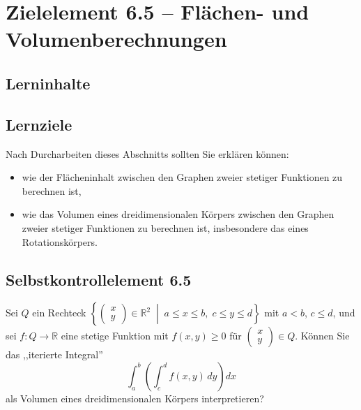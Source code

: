 \documentclass[a4paper,12pt]{article}
\begin{document}
\section*{Zielelement 6.5 -- Flächen- und Volumenberechnungen}

\subsection*{Lerninhalte}

\begin{center}
\end{center}

\subsection*{Lernziele}

Nach Durcharbeiten dieses Abschnitts sollten Sie erklären können:
\begin{itemize}
  \item wie der Flächeninhalt zwischen den Graphen zweier stetiger Funktionen
        zu berechnen ist,
  \item wie das Volumen eines dreidimensionalen Körpers zwischen den Graphen
        zweier stetiger Funktionen zu berechnen ist, insbesondere das eines
        Rotationskörpers.
\end{itemize}

\subsection*{Selbstkontrollelement 6.5}

Sei $Q$ ein Rechteck
$\left\{\begin{pmatrix}x\\y\end{pmatrix} \in \mathbb{R}^2 \;\middle|\; a \leq x \leq b,\; c \leq y \leq d\right\}$
mit $a < b$, $c \leq d$, und sei $f: Q \to \mathbb{R}$ eine stetige Funktion
mit $f(x,y) \geq 0$ für $\begin{pmatrix}x\\y\end{pmatrix} \in Q$. Können Sie
das ,,iterierte Integral''
\[
  \int_a^b \left( \int_c^d f(x,y)\,dy \right) dx
\]
als Volumen eines dreidimensionalen Körpers interpretieren?
\end{document}
